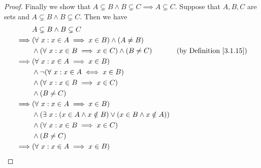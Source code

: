 \begin{proof}
    Finally we show that \(A \subsetneq B \land B \subsetneq C \implies A \subsetneq C\).
    Suppose that \(A, B, C\) are sets and \(A \subsetneq B \land B \subsetneq C\).
    Then we have
    \begin{align*}
                 & A \subsetneq B \land B \subsetneq C                                                                                                        \\
        \implies & (\forall\ x : x \in A \implies x \in B) \land (A \neq B)                                                                                   \\
                 & \land (\forall\ x : x \in B \implies x \in C) \land (B \neq C)                  & \text{(by Definition \ref{3.1.15})}                      \\
        \implies & (\forall\ x : x \in A \implies x \in B)                                                                                                    \\
                 & \land \lnot(\forall\ x : x \in A \iff x \in B)                                                                                             \\
                 & \land (\forall\ x : x \in B \implies x \in C)                                                                                              \\
                 & \land (B \neq C)                                                                                                                           \\
        \implies & (\forall\ x : x \in A \implies x \in B)                                                                                                    \\
                 & \land (\exists\ x : (x \in A \land x \notin B) \lor (x \in B \land x \notin A))                                                            \\
                 & \land (\forall\ x : x \in B \implies x \in C)                                                                                              \\
                 & \land (B \neq C)                                                                                                                           \\
        \implies & (\forall\ x : x \in A \implies x \in B)                                                                                                    \\

\end{align*}
\end{proof}
